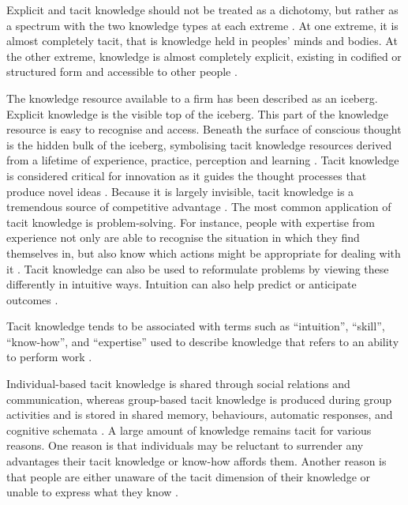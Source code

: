 Explicit and tacit knowledge should not be treated as a dichotomy, but rather as a spectrum with the two knowledge types at each extreme \citep{polanyi1967tacit,inkpen1998knowledge,cavusgil2003tacit}. At one extreme, it is almost completely tacit, that is knowledge held in peoples' minds and bodies. At the other extreme, knowledge is almost completely explicit, existing in codified or structured form and accessible to other people \citep{leonard1998role}. 

The knowledge resource available to a firm has been described as an iceberg. Explicit knowledge is the visible top of the iceberg. This part of the knowledge resource is easy to recognise and access. Beneath the surface of conscious thought is the hidden bulk of the iceberg, symbolising tacit knowledge resources derived from a lifetime of experience, practice, perception and learning \citep{spender1996making,haldin2000difficulties,mcadam2007exploring,rebernik2007fostering}. Tacit knowledge is considered critical for innovation as it guides the thought processes that produce novel ideas \citep{leonard1998role,amar2008descriptive}. Because it is largely invisible, tacit knowledge is a tremendous source of competitive advantage \citep{nelson1982evolutionary,barney1991firm,grant1996toward,smith2001role,chilton2007dimensions,lu2015job}. The most common application of tacit knowledge is problem-solving. For instance, people with expertise from experience not only are able to recognise the situation in which they find themselves in, but also know which actions might be appropriate for dealing with it \citep{simon1971human,leonard1998role}. Tacit knowledge can also be used to reformulate problems by viewing these differently in intuitive ways. Intuition can also help predict or anticipate outcomes \citep{leonard1998role}.\medskip

Tacit knowledge tends to be associated with terms such as \enquote{intuition}, \enquote{skill}, \enquote{know-how}, and \enquote{expertise} used to describe knowledge that refers to an ability to perform work \citep{mcadam2007exploring}. \medskip

Individual-based tacit knowledge is shared through social relations and communication, whereas group-based tacit knowledge is produced during group activities and is stored in shared memory, behaviours, automatic responses, and cognitive schemata \citep{goksel2016can}. A large amount of knowledge remains tacit for various reasons. One reason is that individuals may be reluctant to surrender any advantages their tacit knowledge or know-how affords them. Another reason is that people are either unaware of the tacit dimension of their knowledge or unable to express what they know \citep{leonard1998role,eraut2000non}. \medskip



